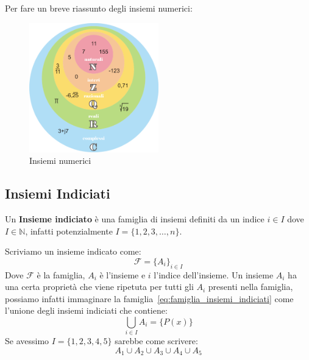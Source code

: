 \documentclass{article}
\theoremstyle{definition}
\begin{document}
Per fare un breve riassunto degli insiemi numerici:
\begin{figure}[h]
        \centering
                \includegraphics[width=0.5\textwidth]{insiemi_numerici.png}
        \caption{Insiemi numerici}\label{fig:insiemi_numerici}
\end{figure}



\subsection{Insiemi Indiciati}\label{sec:insiemi_indiciati}
Un \textbf{Insieme indiciato} è una famiglia di insiemi definiti da un indice $i \in I$ dove $I \in \mathbb{N}$, infatti potenzialmente $I = \{1,2,3,\ldots,n\}$. \par
Scriviamo un insieme indicato come:
\begin{equation}\label{eq:famiglia_insiemi_indiciati}
        \mathcal{F} = {\{A_i\}}_{i \in I}
\end{equation} 
Dove $\mathcal{F}$ è la famiglia, $A_i$ è l'insieme e $i$ l'indice dell'insieme. \newline
Un insieme $A_i$ ha una certa proprietà che viene ripetuta per tutti gli $A_i$ presenti nella famiglia, possiamo infatti immaginare la famiglia~\ref{eq:famiglia_insiemi_indiciati} come l'unione degli insiemi indiciati che contiene:
\begin{equation*}
        \bigcup_{i \in I}A_i = \{P(x)\}
\end{equation*}
Se avessimo $I = \{1,2,3,4,5\}$ sarebbe come scrivere:
\begin{equation*}
        A_1 \cup A_2 \cup A_3 \cup A_4 \cup A_5
\end{equation*}
\end{document}
